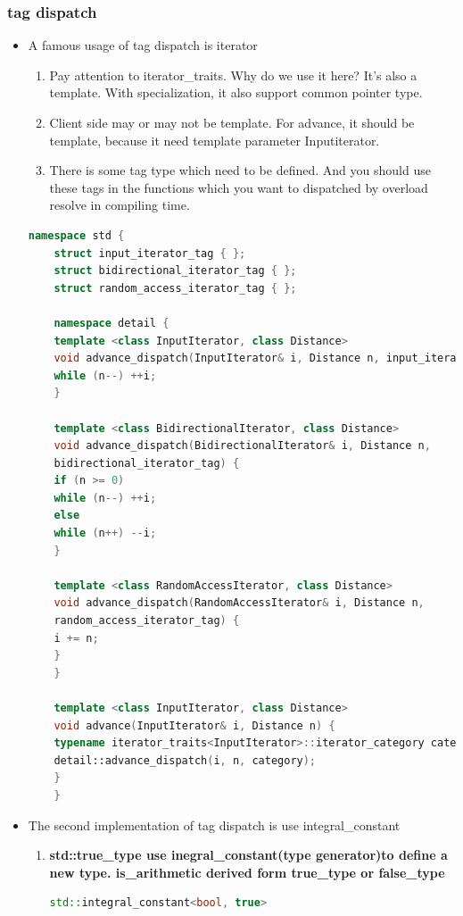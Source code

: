 \documentclass[a4paper,12pt,twoside]{book}
\begin{document}
\subsubsection{tag dispatch}
\begin{itemize}
	\item A famous usage of tag dispatch is iterator 
	\begin{enumerate}
		\item Pay attention to iterator\_traits. Why do we use it here? It's also a template. With specialization, it also support common pointer type.
		\item Client side may or may not be template. For advance, it should be template, because it need template parameter Inputiterator.
		\item There is some tag type which need to be defined. And you should use these tags in the functions which you want to dispatched by overload resolve in compiling time. 
	\end{enumerate}
	\begin{lstlisting}[frame=single, language=c++]
	namespace std {
	struct input_iterator_tag { };
	struct bidirectional_iterator_tag { };
	struct random_access_iterator_tag { };
	
	namespace detail {
	template <class InputIterator, class Distance>
	void advance_dispatch(InputIterator& i, Distance n, input_iterator_tag) {
	while (n--) ++i;
	}
	
	template <class BidirectionalIterator, class Distance>
	void advance_dispatch(BidirectionalIterator& i, Distance n, 
	bidirectional_iterator_tag) {
	if (n >= 0)
	while (n--) ++i;
	else
	while (n++) --i;
	}
	
	template <class RandomAccessIterator, class Distance>
	void advance_dispatch(RandomAccessIterator& i, Distance n, 
	random_access_iterator_tag) {
	i += n;
	}
	}
	
	template <class InputIterator, class Distance>
	void advance(InputIterator& i, Distance n) {
	typename iterator_traits<InputIterator>::iterator_category category;
	detail::advance_dispatch(i, n, category);
	}
	}
	\end{lstlisting}
	
	\item The second implementation of tag dispatch is use integral\_constant
	\begin{enumerate}
		\item \textbf{std::true\_type use inegral\_constant(type generator)to define a new type. is\_arithmetic derived form true\_type or false\_type}
		\begin{lstlisting}[frame=single, language=c++]
		std::integral_constant<bool, true>
		

\end{lstlisting}
\end{enumerate}
\end{itemize}
\end{document}
